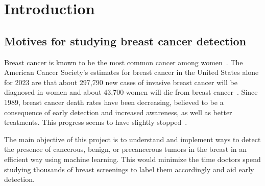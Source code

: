 \chapter{Introduction}
\label{intro}

\section{Motives for studying breast cancer detection}


Breast cancer is known to be the most common cancer among women~\cite{link1}. The American Cancer Society’s estimates for breast cancer in the United States alone for 2023 are that about 297,790 new cases of invasive breast cancer will be diagnosed in women and about 43,700 women will die from breast cancer~\cite{link2}. Since 1989, breast cancer death rates have been decreasing, believed to be a consequence of early detection and increased awareness, as well as better treatments. This progress seems to have slightly stopped~\cite{link2}.

The main objective of this project is to understand and implement ways to detect the presence of cancerous, benign, or precancerous tumors in the breast in an efficient way using machine learning. This would minimize the time doctors spend studying thousands of breast screenings to label them accordingly and aid early detection.